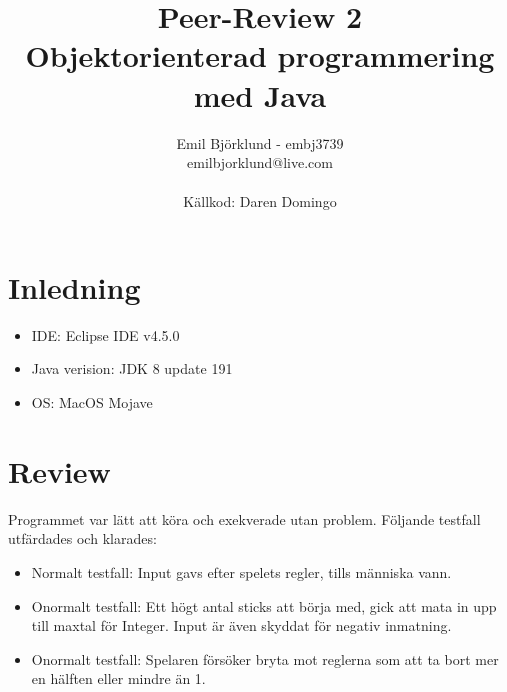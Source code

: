 \documentclass[hidelinks]{article}
\title{Peer-Review 2 \\ Objektorienterad programmering med Java}
\author{Emil Björklund - embj3739 \\ emilbjorklund@live.com \\ \\ Källkod: Daren Domingo}
\begin{document}
\maketitle 
\newpage

\section*{Inledning}
\begin {itemize}
\item IDE: Eclipse IDE v4.5.0
\item Java verision: JDK 8 update 191
\item OS: MacOS Mojave
\end{itemize}



\section*{Review}
Programmet var lätt att köra och exekverade utan problem. Följande testfall utfärdades och klarades: \\
\begin{itemize}
\item Normalt testfall: Input gavs efter spelets regler, tills människa vann.
\item Onormalt testfall: Ett högt antal sticks att börja med, gick att mata in upp till maxtal för Integer. Input är även skyddat för negativ inmatning.
\item Onormalt testfall: Spelaren försöker bryta mot reglerna som att ta bort mer en hälften eller mindre än 1.
\end{itemize}
\end{document}
